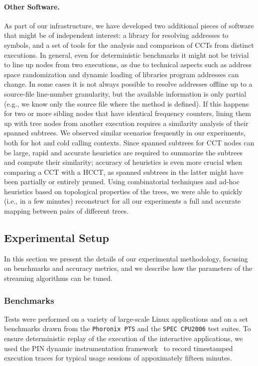 \paragraph*{Other Software.} As part of our infrastructure, we have developed two additional pieces of software that might be of independent interest: a library for resolving addresses to symbols, and a set of tools for the analysis and comparison of CCTs from distinct executions. In general, even for deterministic benchmarks it might not be trivial to line up nodes from two executions, as due to technical aspects such as address space randomization and dynamic loading of libraries program addresses can change. In some cases it is not always possible to resolve addresses offline up to a source-file line-number granularity, but the available information is only partial (e.g., we know only the source file where the method is defined). If this happens for two or more sibling nodes that have identical frequency counters, lining them up with tree nodes from another execution requires a similarity analysis of their spanned subtrees. We observed similar scenarios frequently in our experiments, both for hot and cold calling contexts. Since spanned subtrees for CCT nodes can be large, rapid and accurate heuristics are required to summarize the subtrees and compute their similarity; accuracy of heuristics is even more crucial when comparing a CCT with a HCCT, as spanned subtrees in the latter might have been partially or entirely pruned. Using combinatorial techniques and ad-hoc heuristics based on topological properties of the trees, we were able to quickly (i.e., in a few minutes) reconstruct for all our experiments a full and accurate mapping between pairs of different trees.

\subsection{Experimental Setup}
\label{ss:hcct-experimental-setup}

In this section we present the details of our experimental methodology, focusing on benchmarks and accuracy metrics, and we describe how the parameters of the streaming algorithms can be tuned.

\subsubsection*{Benchmarks}
Tests were performed on a variety of large-scale Linux applications and on a set benchmarks drawn from the {\tt Phoronix PTS} and the {\tt SPEC CPU2006} test suites. To ensure deterministic replay of the execution of the interactive applications, we used the PIN dynamic instrumentation framework~\cite{Luk05} to record timestamped execution traces for typical usage sessions of appoximately fifteen minutes.

